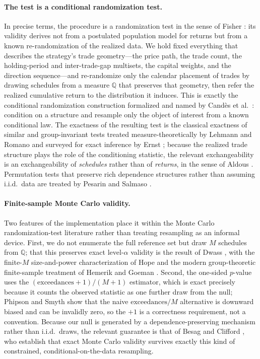 \documentclass[preprint,12pt]{elsarticle}
\theoremstyle{definition}
\begin{document}
\paragraph{The test is a conditional randomization test.} In precise terms, the procedure is a randomization test in the sense of Fisher \cite{Fisher1935}: its validity derives not from a postulated population model for returns but from a known re-randomization of the realized data. We hold fixed everything that describes the strategy's trade geometry---the price path, the trade count, the holding-period and inter-trade-gap multisets, the capital weights, and the direction sequence---and re-randomize only the calendar placement of trades by drawing schedules from a measure $\mathbb{Q}$ that preserves that geometry, then refer the realized cumulative return to the distribution it induces. This is exactly the conditional randomization construction formalized and named by Cand\`es et al.\ \cite{Candes2018}: condition on a structure and resample only the object of interest from a known conditional law. The exactness of the resulting test is the classical exactness of similar and group-invariant tests treated measure-theoretically by Lehmann and Romano \cite{LehmannRomano2005} and surveyed for exact inference by Ernst \cite{Ernst2004}; because the realized trade structure plays the role of the conditioning statistic, the relevant exchangeability is an exchangeability of \emph{schedules} rather than of \emph{returns}, in the sense of Aldous \cite{Aldous1985}. Permutation tests that preserve rich dependence structures rather than assuming i.i.d.\ data are treated by Pesarin and Salmaso \cite{PesarinSalmaso2010}.

\paragraph{Finite-sample Monte Carlo validity.} Two features of the implementation place it within the Monte Carlo randomization-test literature rather than treating resampling as an informal device. First, we do not enumerate the full reference set but draw $M$ schedules from $\mathbb{Q}$; that this preserves exact level-$\alpha$ validity is the result of Dwass \cite{Dwass1957}, with the finite-$M$ size-and-power characterization of Hope \cite{Hope1968} and the modern group-theoretic finite-sample treatment of Hemerik and Goeman \cite{HemerikGoeman2018}. Second, the one-sided $p$-value uses the $(\text{exceedances}+1)/(M+1)$ estimator, which is exact precisely because it counts the observed statistic as one further draw from the null; Phipson and Smyth \cite{PhipsonSmyth2010} show that the naive $\text{exceedances}/M$ alternative is downward biased and can be invalidly zero, so the $+1$ is a correctness requirement, not a convention. Because our null is generated by a dependence-preserving mechanism rather than i.i.d.\ draws, the relevant guarantee is that of Besag and Clifford \cite{BesagClifford1989}, who establish that exact Monte Carlo validity survives exactly this kind of constrained, conditional-on-the-data resampling.
\end{document}

